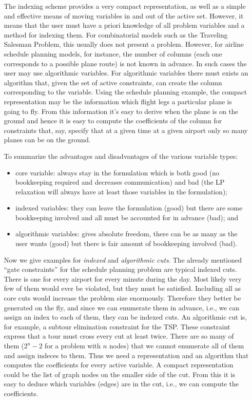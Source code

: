 The indexing scheme provides a very compact representation, as well as a
simple and effective means of moving variables in and out of the active set.
However, it means that the user must have a priori knowledge of all problem
variables and a method for indexing them. For combinatorial models such as the
Traveling Salesman Problem, this usually does not present a problem. 
However, for airline schedule planning models, for instance, the number of
columns (each one corresponds to a possible plane route) is not known in 
advance. In such cases the user may use algorithmic variables. For
algorithmic variables there must exists an algorithm that, given the set of
active constraints, can create the column corresponding to the variable. Using
the schedule planning example, the compact representation may be the
information which flight legs a particular plane is going to fly. From this
information it's easy to derive when the plane is on the ground and hence it
is easy to compute the coefficients of the column for constraints that, say,
specify that at a given time at a given airport only so many planes can be on
the ground.


To summarize the advantages and disadvantages of the various variable types:
\begin{itemize}
\item core variable: always stay in the formulation which is both good (no
  bookkeeping required and decreases communication) and bad (the LP relaxation
  will always have at least 
  those variables in the formulation); 
\item indexed variables: they can leave the formulation (good) but there are
  some bookkeeping involved and all must be accounted for in advance (bad);
  and 
\item algorithmic variables: gives absolute freedom, there can be as many as
  the user wants (good) but there is fair amount of bookkeeping involved (bad).
\end{itemize}

Now we give examples for {\em indexed} and {\em algorithmic cuts}. 
The already mentioned
``gate constraints'' for the schedule planning problem are typical indexed
cuts. There is one for every airport for every minute during the day. Most
likely very few of them would ever be violated, but they must be satisfied.
Including all as core cuts would increase the problem size enormously.
Therefore they better be generated on the fly, and since we can enumerate them
in advance, i.e., we can assign an index to each of them, they can be indexed
cuts. An algorithmic cut is, for example, a subtour elimination constraint
for the TSP. These constraint express that a tour must cross every cut at
least twice. There are so many of them ($2^n-2$ for a problem with $n$ nodes)
that we cannot enumerate all of them and assign indeces to them. Thus we need
a representation and an algorithm that computes the coefficients for every
active variable. A compact representation could be the list of graph nodes on
the smaller side of the cut. From this it is easy to deduce which variables
(edges) are in the cut, i.e., we can compute the coefficients.

